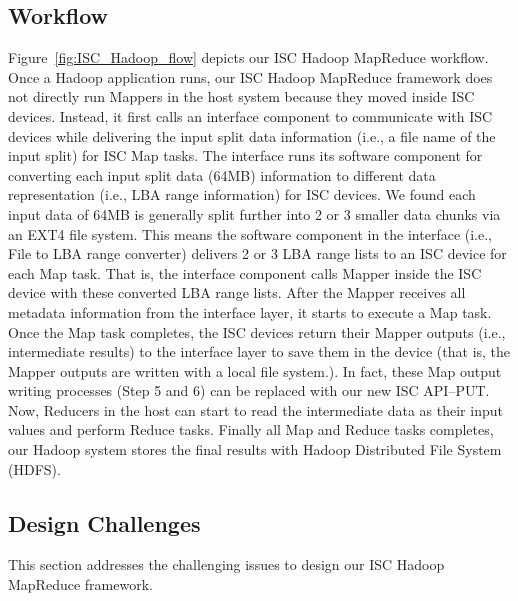 \subsection{Workflow}\label{sec:workflow}
Figure~\ref{fig:ISC_Hadoop_flow} depicts our ISC Hadoop MapReduce workflow. Once a Hadoop application runs, our ISC Hadoop MapReduce framework does not directly run Mappers in the host system because they moved inside ISC devices. Instead, it first calls an interface component to communicate with ISC devices while delivering the input split data information (i.e., a file name of the input split) for ISC Map tasks. The interface runs its software component for converting each input split data (64MB) information to different data representation (i.e., LBA range information) for ISC devices. We found each input data of 64MB is generally split further into 2 or 3 smaller data chunks via an EXT4 file system. This means the software component in the interface (i.e., File to LBA range converter) delivers 2 or 3 LBA range lists to an ISC device for each Map task.
That is, the interface component calls Mapper inside the ISC device with these converted LBA range lists. After the Mapper receives all metadata information from the interface layer, it starts to execute a Map task. Once the Map task completes, the ISC devices return their Mapper outputs (i.e., intermediate results) to the interface layer to save them in the device (that is, the Mapper outputs are written with a local file system.). In fact, these Map output writing processes (Step 5 and 6) can be replaced with our new ISC API--PUT. Now, Reducers in the host can start to read the intermediate data as their input values and perform Reduce tasks. Finally all Map and Reduce tasks completes, our Hadoop system stores the final results with Hadoop Distributed File System (HDFS).



\subsection{Design Challenges}\label{sec:challenges}
This section addresses the challenging issues to design our ISC Hadoop MapReduce framework.

